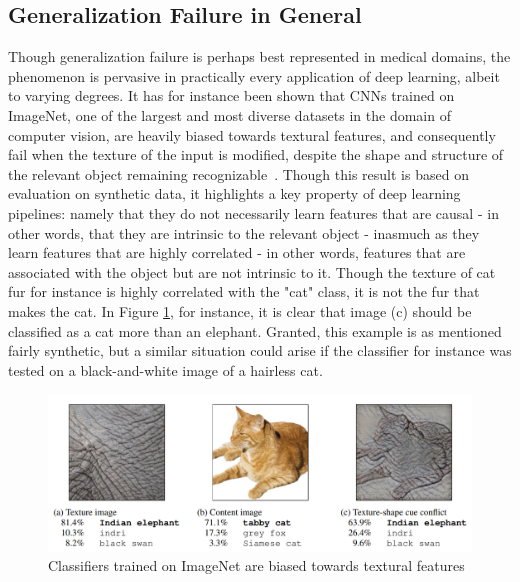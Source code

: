 	\subsection{Generalization Failure in General}
	Though generalization failure is perhaps best represented in medical domains, the phenomenon is pervasive in practically every application of deep learning, albeit to varying degrees. It has for instance been shown that CNNs trained on ImageNet, one of the largest and most diverse datasets in the domain of computer vision, are heavily biased towards textural features, and consequently fail when the texture of the input is modified, despite the shape and structure of the relevant object remaining recognizable~\cite{texturebias}. Though this result is based on evaluation on synthetic data, it highlights a key property of deep learning pipelines: namely that they do not necessarily learn features that are causal - in other words, that they are intrinsic to the relevant object - inasmuch as they learn features that are highly correlated - in other words, features that are associated with the object but are not intrinsic to it. Though the texture of cat fur for instance is highly correlated with the "cat" class, it is not the fur that makes the cat. In Figure \ref{cat_elephant}, for instance, it is clear that image (c) should be classified as a cat more than an elephant. Granted, this example is as mentioned fairly synthetic, but a similar situation could arise if the classifier for instance was tested on a black-and-white image of a hairless cat. 
	\begin{figure}[ht]
		\includegraphics[width=\linewidth]{illustrations/cat_elephant.png}
		\caption{Classifiers trained on ImageNet are biased towards textural features}
		\label{cat_elephant}
	\end{figure}
	
